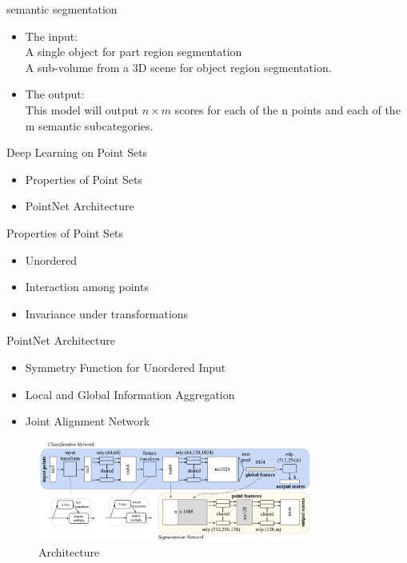 \documentclass[serif,mathserif]{beamer}
\begin{document}
\begin{frame}{semantic segmentation}
	\begin{itemize}
		\item The input: \\
		A single object for part region segmentation \\
		A sub-volume from a 3D scene for object region segmentation.
		\item The output: \\
		This model will output $ n \times m $ scores for each of the n points and each of the m semantic    
		subcategories.
	\end{itemize}
\end{frame}

\begin{frame}{Deep Learning on Point Sets}
	\begin{itemize}
		\item Properties of Point Sets
		\item PointNet Architecture
	\end{itemize}
\end{frame}

\begin{frame}{Properties of Point Sets}
	\begin{itemize}
		\item Unordered
		\item Interaction among points
		\item Invariance under transformations
	\end{itemize}
\end{frame}

\begin{frame}{PointNet Architecture}
	\begin{itemize}
		\item Symmetry Function for Unordered Input
		\item Local and Global Information Aggregation
		\item Joint Alignment Network
	\end{itemize}
	\begin{figure}
		\includegraphics[width=9cm]{image/pointnet_arch.jpg}
		\caption{Architecture}
	\end{figure}
\end{frame}
\end{document}
